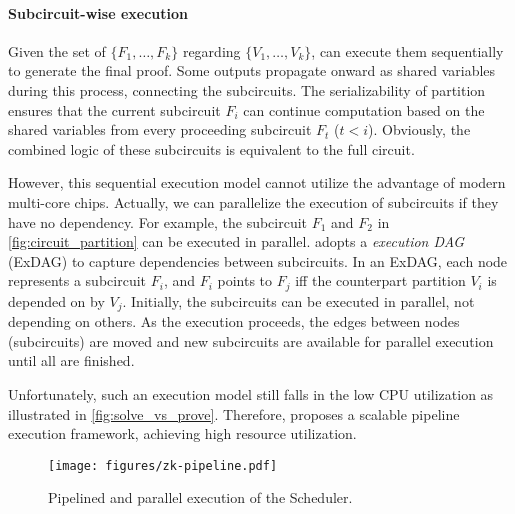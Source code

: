 \paragraph{Subcircuit-wise execution} 
Given the set of $\{F_1, \ldots, F_k\}$ regarding $\{V_1, \ldots, V_k\}$, \system can execute them sequentially to generate the final proof. Some outputs propagate onward as shared variables during this process, connecting the subcircuits. The serializability of partition ensures that the current subcircuit $F_i$ can continue computation based on the shared variables from every proceeding subcircuit $F_t$ ($t<i$). Obviously, the combined logic of these subcircuits is equivalent to the full circuit.

However, this sequential execution model cannot utilize the advantage of modern multi-core chips. Actually, we can parallelize the execution of subcircuits if they have no dependency. For example, the subcircuit $F_1$ and $F_2$ in \cref{fig:circuit_partition} can be executed in parallel. \system adopts a \emph{execution DAG} (ExDAG) to capture dependencies between subcircuits. In an ExDAG, each node represents a subcircuit $F_i$, and $F_i$ points to $F_j$ iff %
the counterpart partition $V_i$ is depended on by $V_j$. Initially, the subcircuits can be executed in parallel, not depending on others. As the execution proceeds, the edges between nodes (subcircuits) are moved and new subcircuits are available for parallel execution until all are finished.  


Unfortunately, such an execution model still falls in the low CPU utilization as illustrated in \cref{fig:solve_vs_prove}. Therefore, \system proposes a scalable pipeline execution framework, achieving high resource utilization. 

\begin{figure}[t]
    \centering
    \texttt{[image: figures/zk-pipeline.pdf]}
    \caption{Pipelined and parallel execution of the Scheduler.}
    \label{fig:scheduler}
\end{figure}







